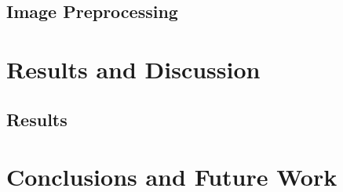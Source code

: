 \documentclass[a4paper,10pt]{book}
\begin{document}
\section{Image Preprocessing}

\chapter{Results and Discussion}
\section{Results}

\chapter{Conclusions and Future Work}

\backmatter
{}


\end{document}
